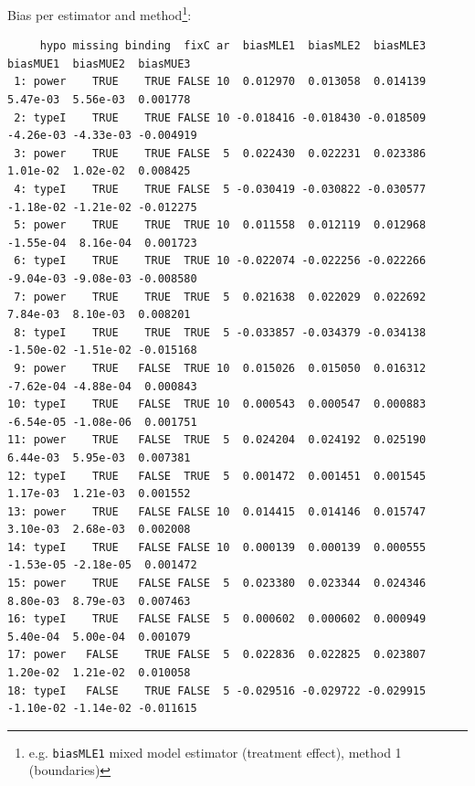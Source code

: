 \documentclass[12pt]{article}
\begin{document}
Bias per estimator and method\footnote{e.g. \texttt{biasMLE1} mixed model
estimator (treatment effect), method 1 (boundaries)}:
\begin{adjustwidth}{-1cm}{-1cm}
\begin{verbatim}
     hypo missing binding  fixC ar  biasMLE1  biasMLE2  biasMLE3  biasMUE1  biasMUE2  biasMUE3
 1: power    TRUE    TRUE FALSE 10  0.012970  0.013058  0.014139  5.47e-03  5.56e-03  0.001778
 2: typeI    TRUE    TRUE FALSE 10 -0.018416 -0.018430 -0.018509 -4.26e-03 -4.33e-03 -0.004919
 3: power    TRUE    TRUE FALSE  5  0.022430  0.022231  0.023386  1.01e-02  1.02e-02  0.008425
 4: typeI    TRUE    TRUE FALSE  5 -0.030419 -0.030822 -0.030577 -1.18e-02 -1.21e-02 -0.012275
 5: power    TRUE    TRUE  TRUE 10  0.011558  0.012119  0.012968 -1.55e-04  8.16e-04  0.001723
 6: typeI    TRUE    TRUE  TRUE 10 -0.022074 -0.022256 -0.022266 -9.04e-03 -9.08e-03 -0.008580
 7: power    TRUE    TRUE  TRUE  5  0.021638  0.022029  0.022692  7.84e-03  8.10e-03  0.008201
 8: typeI    TRUE    TRUE  TRUE  5 -0.033857 -0.034379 -0.034138 -1.50e-02 -1.51e-02 -0.015168
 9: power    TRUE   FALSE  TRUE 10  0.015026  0.015050  0.016312 -7.62e-04 -4.88e-04  0.000843
10: typeI    TRUE   FALSE  TRUE 10  0.000543  0.000547  0.000883 -6.54e-05 -1.08e-06  0.001751
11: power    TRUE   FALSE  TRUE  5  0.024204  0.024192  0.025190  6.44e-03  5.95e-03  0.007381
12: typeI    TRUE   FALSE  TRUE  5  0.001472  0.001451  0.001545  1.17e-03  1.21e-03  0.001552
13: power    TRUE   FALSE FALSE 10  0.014415  0.014146  0.015747  3.10e-03  2.68e-03  0.002008
14: typeI    TRUE   FALSE FALSE 10  0.000139  0.000139  0.000555 -1.53e-05 -2.18e-05  0.001472
15: power    TRUE   FALSE FALSE  5  0.023380  0.023344  0.024346  8.80e-03  8.79e-03  0.007463
16: typeI    TRUE   FALSE FALSE  5  0.000602  0.000602  0.000949  5.40e-04  5.00e-04  0.001079
17: power   FALSE    TRUE FALSE  5  0.022836  0.022825  0.023807  1.20e-02  1.21e-02  0.010058
18: typeI   FALSE    TRUE FALSE  5 -0.029516 -0.029722 -0.029915 -1.10e-02 -1.14e-02 -0.011615
\end{verbatim}
\end{adjustwidth}
\end{document}
